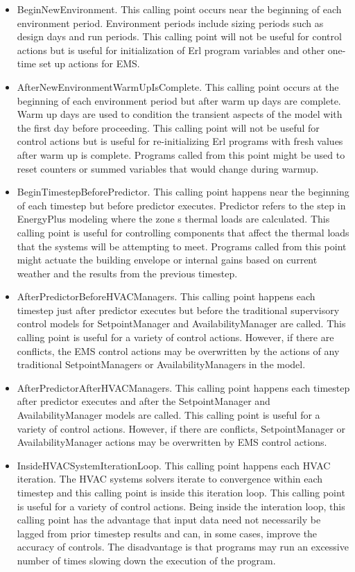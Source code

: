 \begin{itemize}
\item
  BeginNewEnvironment. This calling point occurs near the beginning of each environment period. Environment periods include sizing periods such as design days and run periods. This calling point will not be useful for control actions but is useful for initialization of Erl program variables and other one-time set up actions for EMS.
\item
  AfterNewEnvironmentWarmUpIsComplete. This calling point occurs at the beginning of each environment period but after warm up days are complete. Warm up days are used to condition the transient aspects of the model with the first day before proceeding. This calling point will not be useful for control actions but is useful for re-initializing Erl programs with fresh values after warm up is complete. Programs called from this point might be used to reset counters or summed variables that would change during warmup.
\item
  BeginTimestepBeforePredictor. This calling point happens near the beginning of each timestep but before predictor executes. Predictor refers to the step in EnergyPlus modeling where the zone s thermal loads are calculated. This calling point is useful for controlling components that affect the thermal loads that the systems will be attempting to meet. Programs called from this point might actuate the building envelope or internal gains based on current weather and the results from the previous timestep.
\item
  AfterPredictorBeforeHVACManagers. This calling point happens each timestep just after predictor executes but before the traditional supervisory control models for SetpointManager and AvailabilityManager are called. This calling point is useful for a variety of control actions. However, if there are conflicts, the EMS control actions may be overwritten by the actions of any traditional SetpointManagers or AvailabilityManagers in the model.
\item
  AfterPredictorAfterHVACManagers. This calling point happens each timestep after predictor executes and after the SetpointManager and AvailabilityManager models are called. This calling point is useful for a variety of control actions. However, if there are conflicts, SetpointManager or AvailabilityManager actions may be overwritten by EMS control actions.
\item
  InsideHVACSystemIterationLoop. This calling point happens each HVAC iteration. The HVAC systems solvers iterate to convergence within each timestep and this calling point is inside this iteration loop. This calling point is useful for a variety of control actions. Being inside the interation loop, this calling point has the advantage that input data need not necessarily be lagged from prior timestep results and can, in some cases, improve the accuracy of controls. The disadvantage is that programs may run an excessive number of times slowing down the execution of the program.

\end{itemize}
